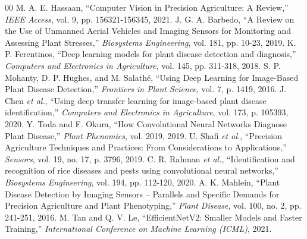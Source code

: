 \documentclass[conference]{IEEEtran}
\begin{document}
\begin{thebibliography}{00}
 M. A. E. Hassaan, ``Computer Vision in Precision Agriculture: A Review,'' \textit{IEEE Access}, vol. 9, pp. 156321-156345, 2021.
 J. G. A. Barbedo, ``A Review on the Use of Unmanned Aerial Vehicles and Imaging Sensors for Monitoring and Assessing Plant Stresses,'' \textit{Biosystems Engineering}, vol. 181, pp. 10-23, 2019.
 K. P. Ferentinos, ``Deep learning models for plant disease detection and diagnosis,'' \textit{Computers and Electronics in Agriculture}, vol. 145, pp. 311-318, 2018.
 S. P. Mohanty, D. P. Hughes, and M. Salathé, ``Using Deep Learning for Image-Based Plant Disease Detection,'' \textit{Frontiers in Plant Science}, vol. 7, p. 1419, 2016.
 J. Chen \textit{et al.}, ``Using deep transfer learning for image-based plant disease identification,'' \textit{Computers and Electronics in Agriculture}, vol. 173, p. 105393, 2020.
 Y. Toda and F. Okura, ``How Convolutional Neural Networks Diagnose Plant Disease,'' \textit{Plant Phenomics}, vol. 2019, 2019.
 U. Shafi \textit{et al.}, ``Precision Agriculture Techniques and Practices: From Considerations to Applications,'' \textit{Sensors}, vol. 19, no. 17, p. 3796, 2019.
 C. R. Rahman \textit{et al.}, ``Identification and recognition of rice diseases and pests using convolutional neural networks,'' \textit{Biosystems Engineering}, vol. 194, pp. 112-120, 2020.
 A. K. Mahlein, ``Plant Disease Detection by Imaging Sensors – Parallels and Specific Demands for Precision Agriculture and Plant Phenotyping,'' \textit{Plant Disease}, vol. 100, no. 2, pp. 241-251, 2016.
 M. Tan and Q. V. Le, ``EfficientNetV2: Smaller Models and Faster Training,'' \textit{International Conference on Machine Learning (ICML)}, 2021.
\end{thebibliography}
\end{document}
